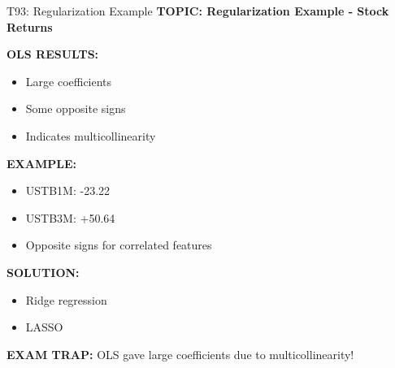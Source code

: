 \documentclass[8pt]{beamer}
\begin{document}
	\begin{frame}{T93: Regularization Example}
		\fontsize{6.5}{7.5}\selectfont
		\textbf{TOPIC: Regularization Example - Stock Returns}
		
		\vspace{0.1cm}
		\textbf{OLS RESULTS:}
		\begin{itemize}
			\item Large coefficients
			\item Some opposite signs
			\item Indicates multicollinearity
		\end{itemize}
		
		\vspace{0.1cm}
		\textbf{EXAMPLE:}
		\begin{itemize}
			\item USTB1M: -23.22
			\item USTB3M: +50.64
			\item Opposite signs for correlated features
		\end{itemize}
		
		\vspace{0.1cm}
		\textbf{SOLUTION:}
		\begin{itemize}
			\item Ridge regression
			\item LASSO
		\end{itemize}
		
		\textcolor{myred}{\textbf{EXAM TRAP:}} OLS gave \textcolor{myblue}{large coefficients} due to multicollinearity!
	\end{frame}
	
\end{document}
